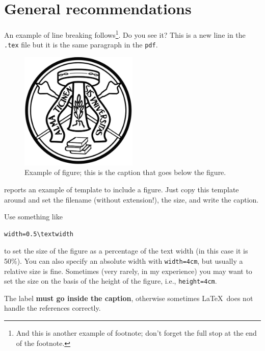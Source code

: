 \section{General recommendations}
\label{s:example_section}

An example of line breaking follows\footnote{And this is another example of footnote; don't forget the full stop at the end of the footnote.}.
Do you see it? This is a new line in the \texttt{.tex} file but it is the same paragraph in the \texttt{pdf}.

\begin{figure}
\centering
\includegraphics[width=0.5\textwidth]{figs/logo-unipv-bw}
\caption[This is the text that goes in the list of figures]{Example of figure; this is the caption that goes below the figure.\label{f:logo}}
\end{figure}

 reports an example of template to include a figure.
Just copy this template around and set the filename (without extension!), the size, and write the caption.

Use something like

\begin{verbatim}
width=0.5\textwidth
\end{verbatim}

to set the size of the figure as a percentage of the text width (in this case it is 50\%).
You can also specify an absolute width with \texttt{width=4cm}, but usually a relative size is fine.
Sometimes (very rarely, in my experience) you may want to set the size on the basis of the height of the figure, i.e., \texttt{height=4cm}.

The label \textbf{must go inside the caption}, otherwise sometimes \LaTeX\ does not handle the references correctly.

